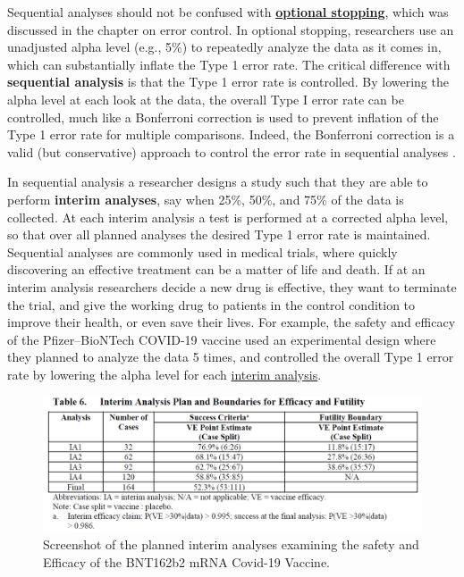 \documentclass[
  oneside]{book}
\begin{document}
Sequential analyses should not be confused with \protect\hyperlink{optionalstopping}{\textbf{optional stopping}}, which was discussed in the chapter on error control. In optional stopping, researchers use an unadjusted alpha level (e.g., 5\%) to repeatedly analyze the data as it comes in, which can substantially inflate the Type 1 error rate. The critical difference with \textbf{sequential analysis} is that the Type 1 error rate is controlled. By lowering the alpha level at each look at the data, the overall Type I error rate can be controlled, much like a Bonferroni correction is used to prevent inflation of the Type 1 error rate for multiple comparisons. Indeed, the Bonferroni correction is a valid (but conservative) approach to control the error rate in sequential analyses \citep{wassmer_group_2016}.

In sequential analysis a researcher designs a study such that they are able to perform \textbf{interim analyses}, say when 25\%, 50\%, and 75\% of the data is collected. At each interim analysis a test is performed at a corrected alpha level, so that over all planned analyses the desired Type 1 error rate is maintained. Sequential analyses are commonly used in medical trials, where quickly discovering an effective treatment can be a matter of life and death. If at an interim analysis researchers decide a new drug is effective, they want to terminate the trial, and give the working drug to patients in the control condition to improve their health, or even save their lives. For example, the safety and efficacy of the Pfizer--BioNTech COVID-19 vaccine used an experimental design where they planned to analyze the data 5 times, and controlled the overall Type 1 error rate by lowering the alpha level for each \href{https://www.nejm.org/doi/suppl/10.1056/NEJMoa2034577/suppl_file/nejmoa2034577_protocol.pdf}{interim analysis}.

\begin{figure}

{\centering \includegraphics[width=1\linewidth]{images/vaccinetrial} 

}

\caption{Screenshot of the planned interim analyses examining the safety and Efficacy of the BNT162b2 mRNA Covid-19 Vaccine.}\label{fig:interim}
\end{figure}
\end{document}
